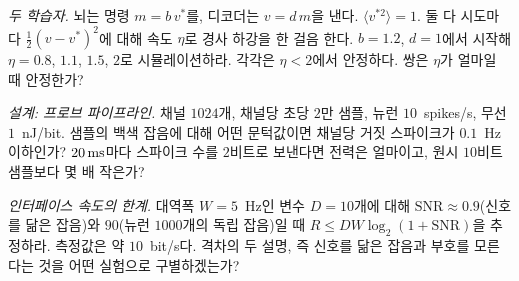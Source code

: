 \begin{exercise}[\lvlB]
\label{ex:17:5}
\emph{두 학습자.} 뇌는 명령 $m=b\,v^*$를, 디코더는 $v=d\,m$을 낸다. $\langle v^{*2}\rangle=1$. 둘 다 시도마다 $\tfrac12(v-v^*)^2$에 대해 속도 $\eta$로 경사 하강을 한 걸음 한다. $b=1.2$, $d=1$에서 시작해 $\eta=0.8$, $1.1$, $1.5$, $2$로 시뮬레이션하라. 각각은 $\eta<2$에서 안정하다. 쌍은 $\eta$가 얼마일 때 안정한가?
\end{exercise}

\begin{exercise}[\lvlB]
\label{ex:17:6}
\emph{설계: 프로브 파이프라인.} 채널 $1024$개, 채널당 초당 $2$만 샘플, 뉴런 $10$~spikes/s, 무선 $1$~nJ/bit. 샘플의 백색 잡음에 대해 어떤 문턱값이면 채널당 거짓 스파이크가 $0.1$~Hz 이하인가? $20\,\text{ms}$마다 스파이크 수를 $2$비트로 보낸다면 전력은 얼마이고, 원시 $10$비트 샘플보다 몇 배 작은가?
\end{exercise}

\begin{exercise}[\lvlC]
\label{ex:17:7}
\emph{인터페이스 속도의 한계.} 대역폭 $W=5$~Hz인 변수 $D=10$개에 대해 $\text{SNR}\approx0.9$(신호를 닮은 잡음)와 $90$(뉴런 $1000$개의 독립 잡음)일 때 $R\le DW\log_2(1+\text{SNR})$을 추정하라. 측정값은 약 $10$~bit/s다. 격차의 두 설명, 즉 신호를 닮은 잡음과 부호를 모른다는 것을 어떤 실험으로 구별하겠는가?
\end{exercise}
